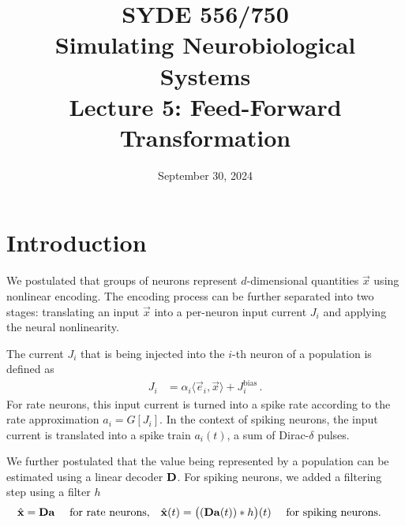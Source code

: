 \documentclass[10pt,letterpaper,oneside]{article}
\date{September 30, 2024}
\title{SYDE 556/750 \\ Simulating Neurobiological Systems \\ Lecture 5: Feed-Forward Transformation}
\begin{document}
	
	
	\section{Introduction}
	
	
	We postulated that groups of neurons represent $d$-dimensional quantities $\vec x$ using nonlinear encoding. The encoding process can be further separated into two stages: translating an input $\vec x$ into a per-neuron input current $J_i$ and applying the neural nonlinearity.
	
	The current $J_i$ that is being injected into the $i$-th neuron of a population is defined as
	\begin{align}
	J_i &= \alpha_i \langle \vec e_i, \vec x \rangle + J^\mathrm{bias}_i \,.
	\label{eqn:current}
	\end{align}
	For rate neurons, this input current is turned into a spike rate according to the rate approximation $a_i = G[J_i]$. In the context of spiking neurons, the input current is translated into a spike train $a_i(t)$, a sum of Dirac-$\delta$ pulses.
	
	We further postulated that the value being represented by a population can be estimated using a linear decoder ${\mathbf{D}}$. For spiking neurons, we added a filtering step using a filter $h$
	\begin{align}
	\hat{{\mathbf{x}}} &= {\mathbf{D}} {\mathbf{a}} \quad \text{ for rate neurons,} & 
	\hat{{\mathbf{x}}}(t) &= \big( ({\mathbf{D}} {\mathbf{a}}(t)) \ast h \big)(t) \quad \text{ for spiking neurons.}
	\label{eqn:decoding}
	\end{align}
	
\end{document}
